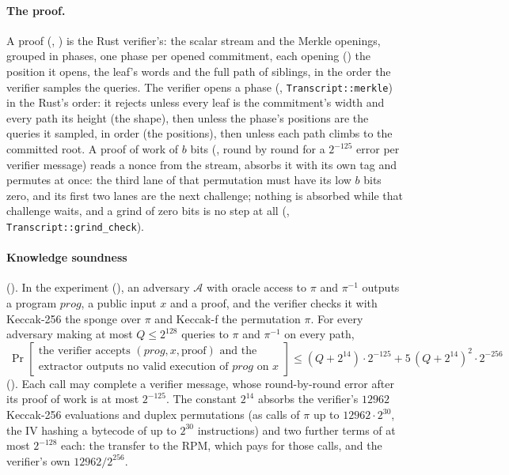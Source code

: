 \documentclass[11pt]{article}
\begin{document}
\paragraph{The proof.} A proof (, ) is the Rust
verifier's: the scalar stream and the Merkle openings, grouped in phases, one phase per opened
commitment, each opening () the position it opens, the leaf's words and the full path
of siblings, in the order the verifier samples the queries. The verifier opens a phase
(, \texttt{Transcript::merkle}) in the Rust's order: it rejects unless every leaf is
the commitment's width and every path its height (the shape), then unless the phase's positions are
the queries it sampled, in order (the positions), then unless each path climbs to the committed
root. A proof of work of $b$ bits (, round by round for a $2^{-125}$ error per
verifier message) reads a nonce from the stream, absorbs it with its own tag and permutes at once:
the third lane of that permutation must have its low $b$ bits zero, and its first two lanes are the
next challenge; nothing is absorbed while that challenge waits, and a grind of zero bits is no step
at all (, \texttt{Transcript::grind\_check}).

\paragraph{Knowledge soundness} (). In the experiment
(), an adversary $\mathcal{A}$ with oracle access to $\pi$ and
$\pi^{-1}$ outputs a program $\mathit{prog}$, a public input $x$ and a proof, and the verifier
checks it with Keccak-256 the sponge over $\pi$ and Keccak-f the permutation $\pi$. For every
adversary making at most $Q \le 2^{128}$ queries to $\pi$ and $\pi^{-1}$ on every path,
\[
\boxed{\ \Pr\left[\begin{array}{l}\text{the verifier accepts } (\mathit{prog},x,\text{proof}) \text{ and the}\\
\text{extractor outputs no valid execution of } \mathit{prog} \text{ on } x\end{array}\right]
\le (Q+2^{14})\cdot 2^{-125} + 5\,(Q+2^{14})^2\cdot 2^{-256}\ }
\]
(). Each call may complete a verifier message, whose
round-by-round error after its proof of work is at most $2^{-125}$. The constant $2^{14}$ absorbs
the verifier's $12962$ Keccak-256 evaluations and duplex permutations (as calls of $\pi$ up to
$12962\cdot 2^{30}$, the IV hashing a bytecode of up to $2^{30}$ instructions) and two further terms
of at most $2^{-128}$ each: the transfer to the RPM, which pays for those calls, and the verifier's own
$12962/2^{256}$.
\end{document}

